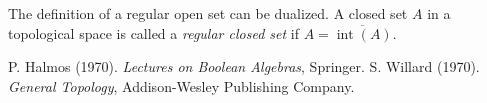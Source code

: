 \documentclass[12pt]{article}
\begin{document}
The definition of a regular open set can be dualized.  A closed set $A$ in a topological space is called a \emph{regular closed set} if $A=\overline{\operatorname{int}(A)}$.

\begin{thebibliography}{[AHU]}
 P. Halmos (1970).  {\em{Lectures on Boolean Algebras}}, Springer.
 S. Willard (1970). \emph{General Topology}, Addison-Wesley Publishing Company.
\end{thebibliography}
\end{document}
